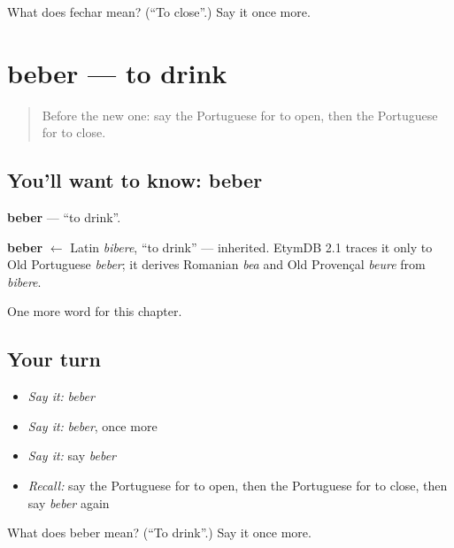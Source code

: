\begin{tcolorbox}[breakable,colback=teal!4,colframe=teal!35!black,title={Before you move on}]
What does fechar mean? (\textquotedblleft{}To close\textquotedblright{}.) Say it once more.
\end{tcolorbox}
\section[beber]{beber — to drink}

\label{lesson:PT-C43-beber}



\begin{quote}
Before the new one: say the Portuguese for to open, then the Portuguese for to close.
\end{quote}

\subsection*{You'll want to know: beber}
\textbf{beber} — \textquotedblleft{}to drink\textquotedblright{}.

\begin{cousinweb}
\textbf{beber} $\leftarrow$ Latin \emph{bibere}, \textquotedblleft{}to drink\textquotedblright{} — inherited. EtymDB 2.1 traces it only to Old Portuguese \emph{beber}; it derives Romanian \emph{bea} and Old Provençal \emph{beure} from \emph{bibere}.
\end{cousinweb}

\begin{grammarlens}[title={What you've built}]
One more word for this chapter.
\end{grammarlens}

\subsection*{Your turn}
\begin{itemize}
\raggedright
  \item \emph{Say it:} \emph{beber}
  \item \emph{Say it:} \emph{beber}, once more
  \item \emph{Say it:} say \emph{beber}
  \item \emph{Recall:} say the Portuguese for to open, then the Portuguese for to close, then say \emph{beber} again
\end{itemize}

\begin{tcolorbox}[breakable,colback=teal!4,colframe=teal!35!black,title={Before you move on}]
What does beber mean? (\textquotedblleft{}To drink\textquotedblright{}.) Say it once more.
\end{tcolorbox}
